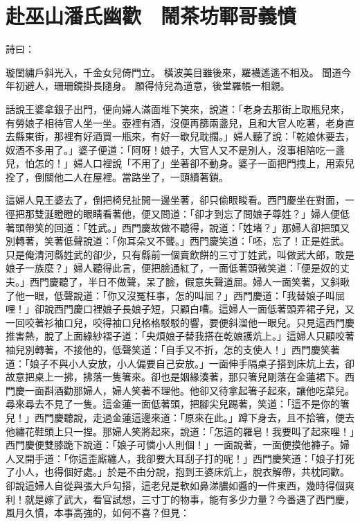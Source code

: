 %

\chapter{赴巫山潘氏幽歡　鬧茶坊鄆哥義憤}

詩曰：

璇閨繡戶斜光入，千金女兒倚門立。
橫波美目雖後來，羅襪遙遙不相及。
聞道今年初避人，珊珊鏡掛長隨身。
願得侍兒為道意，後堂羅帳一相親。

話說王婆拿銀子出門，便向婦人滿面堆下笑來，說道：「老身去那街上取瓶兒來，有勞娘子相待官人坐一坐。壺裡有酒，沒便再篩兩盞兒，且和大官人吃著，老身直去縣東街，那裡有好酒買一瓶來，有好一歇兒耽擱。」婦人聽了說：「乾娘休要去，奴酒不多用了。」婆子便道：「阿呀！娘子，大官人又不是別人，沒事相陪吃一盞兒，怕怎的！」婦人口裡說「不用了」坐著卻不動身。婆子一面把門拽上，用索兒拴了，倒關他二人在屋裡。當路坐了，一頭續著鎖。

這婦人見王婆去了，倒把椅兒扯開一邊坐著，卻只偷眼睃看。西門慶坐在對面，一徑把那雙涎瞪瞪的眼睛看著他，便又問道：「卻才到忘了問娘子尊姓？」婦人便低著頭帶笑的回道：「姓武。」西門慶故做不聽得，說道：「姓堵？」那婦人卻把頭又別轉著，笑著低聲說道：「你耳朵又不聾。」西門慶笑道：「呸，忘了！正是姓武。只是俺清河縣姓武的卻少，只有縣前一個賣飲餅的三寸丁姓武，叫做武大郎，敢是娘子一族麼？」婦人聽得此言，便把臉通紅了，一面低著頭微笑道：「便是奴的丈夫。」西門慶聽了，半日不做聲，呆了臉，假意失聲道屈。婦人一面笑著，又斜瞅了他一眼，低聲說道：「你又沒冤枉事，怎的叫屈？」西門慶道：「我替娘子叫屈哩！」卻說西門慶口裡娘子長娘子短，只顧白嘈。這婦人一面低著頭弄裙子兒，又一回咬著衫袖口兒，咬得袖口兒格格駁駁的響，要便斜溜他一眼兒。只見這西門慶推害熱，脫了上面綠紗褶子道：「央煩娘子替我搭在乾娘護炕上。」這婦人只顧咬著袖兒別轉著，不接他的，低聲笑道：「自手又不折，怎的支使人！」西門慶笑著道：「娘子不與小人安放，小人偏要自己安放。」一面伸手隔桌子搭到床炕上去，卻故意把桌上一拂，拂落一隻箸來。卻也是姻緣湊著，那只箸兒剛落在金蓮裙下。西門慶一面斟酒勸那婦人，婦人笑著不理他。他卻又待拿起箸子起來，讓他吃菜兒。尋來尋去不見了一隻。這金蓮一面低著頭，把腳尖兒踢著，笑道：「這不是你的箸兒！」西門慶聽說，走過金蓮這邊來道：「原來在此。」蹲下身去，且不拾箸，便去他繡花鞋頭上只一捏。那婦人笑將起來，說道：「怎這的羅皂！我要叫了起來哩！」西門慶便雙膝跪下說道：「娘子可憐小人則個！」一面說著，一面便摸他褲子。婦人叉開手道：「你這歪廝纏人，我卻要大耳刮子打的呢！」西門慶笑道：「娘子打死了小人，也得個好處。」於是不由分說，抱到王婆床炕上，脫衣解帶，共枕同歡。卻說這婦人自從與張大戶勾搭，這老兒是軟如鼻涕膿如醬的一件東西，幾時得個爽利！就是嫁了武大，看官試想，三寸丁的物事，能有多少力量？今番遇了西門慶，風月久慣，本事高強的，如何不喜？但見：

